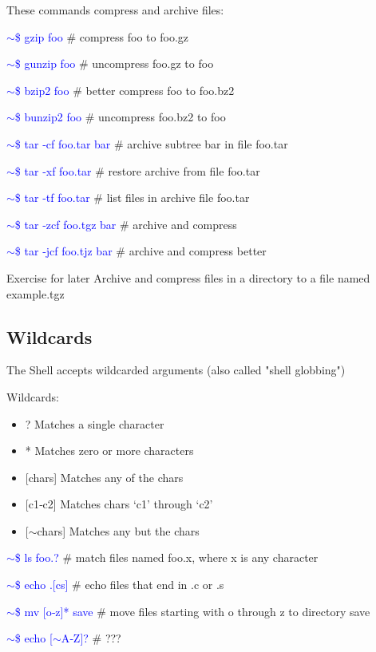 \documentclass{beamer}[10pt, usepdftitle=false, handout]
\newcommand*{\blue}{\textcolor{blue}}
\begin{document}
	\begin{frame}
	
	These commands compress and archive files:
	\vspace*{1em}
	
	\blue{$\sim$\$ gzip foo} \# compress foo to foo.gz

	\blue{$\sim$\$ gunzip foo} \# uncompress foo.gz to foo
	
	\blue{$\sim$\$ bzip2 foo} \# better compress foo to foo.bz2

	\blue{$\sim$\$ bunzip2 foo} \# uncompress foo.bz2 to foo
	
	\blue{$\sim$\$ tar ‐cf foo.tar bar} \# archive subtree bar in file foo.tar
	
	\blue{$\sim$\$ tar ‐xf foo.tar} \# restore archive from file foo.tar

	\blue{$\sim$\$ tar ‐tf foo.tar} \# list files in archive file foo.tar

	\blue{$\sim$\$ tar ‐zcf foo.tgz bar} \# archive and compress
	
	\blue{$\sim$\$ tar ‐jcf foo.tjz bar} \# archive and compress better
	
	\vspace*{1em}
	\begin{block}{Exercise for later}
	Archive and compress files in a directory to a file
named example.tgz
	\end{block}	
	
	\end{frame}
		
	\subsection{Wildcards}		
		
	\begin{frame}
	
	The Shell accepts wildcarded arguments (also called "shell globbing")
	\vspace*{1em}	
	
	Wildcards:
	\vspace*{0.5em}
	
	\begin{itemize}
	\item{? Matches a single character}
	\item{* Matches zero or more characters}
	\item{[chars] Matches any of the chars}
	\item{[c1‐c2] Matches chars ‘c1’ through ‘c2’}
	\item{[$\sim$chars] Matches any but the chars}
	\end{itemize}
	\vspace*{1em}
	
	\blue{$\sim$\$ ls foo.?} \# match files named foo.x, where x is any character

	\blue{$\sim$\$ echo \*.[cs]} \# echo files that end in .c or .s
	
	\blue{$\sim$\$ mv [o‐z]* save} \# move files starting with o through z to directory save

	\blue{$\sim$\$ echo [$\sim$A‐Z]?} \# ???
		
	\end{frame}		
			
\end{document}
